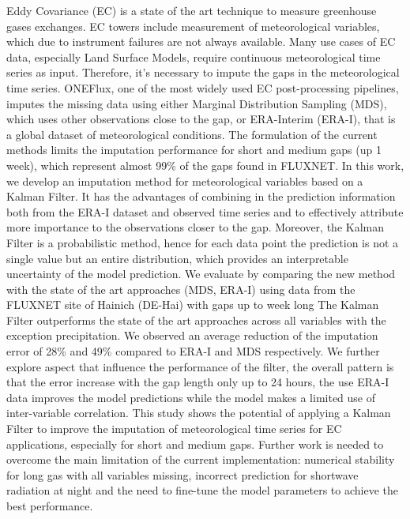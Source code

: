 \documentclass{article}
\begin{document}
Eddy Covariance (EC) is a state of the art technique to measure greenhouse gases exchanges. EC towers include measurement of meteorological variables, which due to instrument failures are not always available. Many use cases of EC data, especially Land Surface Models, require continuous meteorological time series as input. Therefore, it's necessary to impute the gaps in the meteorological time series. ONEFlux, one of the most widely used EC post-processing pipelines, imputes the missing data using either Marginal Distribution Sampling (MDS), which uses other observations close to the gap, or ERA-Interim (ERA-I), that is a global dataset of meteorological conditions. The formulation of the current methods limits the imputation performance for short and medium gaps (up 1 week), which represent almost 99\% of the gaps found in FLUXNET.
In this work, we develop an imputation method for meteorological variables based on a Kalman Filter. It has the advantages of combining in the prediction information both from the ERA-I dataset and observed time series and to effectively attribute more importance to the observations closer to the gap.
Moreover, the Kalman Filter is a probabilistic method, hence for each data point the prediction is not a single value but an entire distribution, which provides an interpretable uncertainty of the model prediction. 
We evaluate by comparing the new method with the state of the art approaches (MDS, ERA-I) using data from the FLUXNET site of Hainich (DE-Hai) with gaps up to week long
The Kalman Filter outperforms the state of the art approaches across all variables with the exception precipitation. We observed an average reduction of the imputation error of 28\% and 49\% compared to ERA-I and MDS respectively. 
We further explore aspect that influence the performance of the filter, the overall pattern is that the error increase with the gap length only up to 24 hours, the use ERA-I data improves the model predictions while the model makes a limited use of inter-variable correlation. 
This study shows the potential of applying a Kalman Filter to improve the imputation of meteorological time series for EC applications, especially for short and medium gaps.
Further work is needed to overcome the main limitation of the current implementation: numerical stability for long gas with all variables missing, incorrect prediction for shortwave radiation at night and the need to fine-tune the model parameters to achieve the best performance. 

\end{document}
